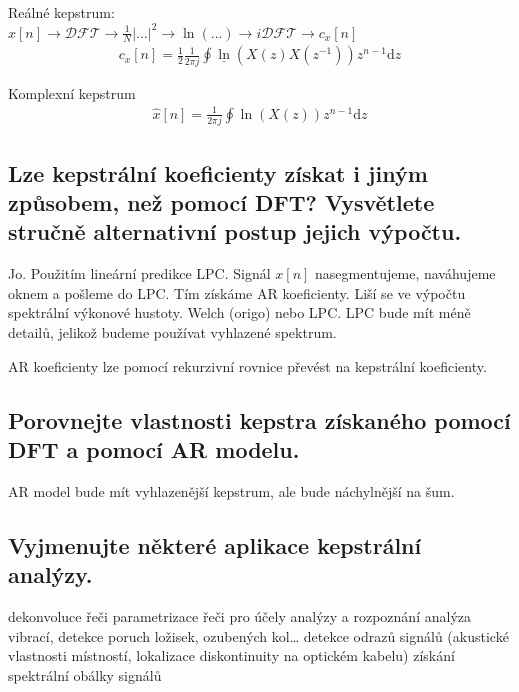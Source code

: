 \documentclass[a4paper,12pt]{article}   %
\newcommand{\mt}[1]{$#1$}
\newcommand{\dd}{\text{d}}
\begin{document}
Reálné kepstrum:\\
\mt{x[n] \rightarrow \mathscr{DFT} \rightarrow \frac{1}{N}|\dots|^2 \rightarrow \ln (...) \rightarrow i\mathscr{DFT} \rightarrow c_x[n]}
\begin{align*}
        c_x[n] = \frac{1}{2}\frac{1}{2\pi j}\oint \underline{\ln}(X(z)X(z^{-1}))z^{n-1}\dd z
\end{align*}



Komplexní kepstrum
\begin{align*}
        \hat{x}[n] = \frac{1}{2\pi j}\oint \ln(X(z))z^{n-1}\dd z
\end{align*}




\subsection{Lze kepstrální koeficienty získat i jiným způsobem, než pomocí DFT? Vysvětlete stručně alternativní postup jejich výpočtu.}

Jo. Použitím lineární predikce LPC. Signál \mt{x[n]} nasegmentujeme, naváhujeme oknem a pošleme do LPC. Tím získáme AR koeficienty. Liší se ve výpočtu spektrální výkonové hustoty. Welch (origo) nebo LPC. LPC bude mít méně detailů, jelikož budeme používat vyhlazené spektrum. 

AR koeficienty lze pomocí rekurzivní rovnice převést na kepstrální koeficienty. 


\subsection{Porovnejte vlastnosti kepstra získaného pomocí DFT a pomocí AR modelu.}

AR model bude mít vyhlazenější kepstrum, ale bude náchylnější na šum.


\subsection{Vyjmenujte některé aplikace kepstrální analýzy.}
\begin{outline}
        \1 dekonvoluce řeči
        \1 parametrizace řeči pro účely analýzy a rozpoznání
        \1 analýza vibrací, detekce poruch ložisek, ozubených kol\dots
        \1 detekce odrazů signálů (akustické vlastnosti místností, lokalizace diskontinuity na optickém kabelu)
        \1 získání spektrální obálky signálů
\end{outline}
\end{document}
